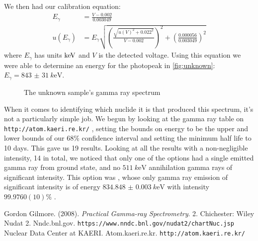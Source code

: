 \documentclass[11pt]{article}
\numberwithin{equation}{section}
\numberwithin{figure}{section}
\numberwithin{table}{section}
\begin{document}
    \par We then had our calibration equation:
    \begin{align*}
        E_{\gamma}&=\frac{V-0.002}{0.003049}\\
        u(E_{\gamma})&=E_{\gamma}\sqrt{\left(\frac{\sqrt{u(V)^2+0.022^2}}{V-0.002}\right)^2 + \left(\frac{0.000056}{0.003049}\right)^2}
    \end{align*}
    where $E_\gamma$ has units $\si[]{k\electronvolt}$ and $V$ is the detected voltage. Using this equation we were able to determine an energy for the photopeak in \autoref{fig:unknown}: $E_\gamma=\SI{843(31)}{k\electronvolt}$.

    \begin{figure}
        \caption{The unknown sample's gamma ray spectrum}
        \label{fig:unknown}
    \end{figure}

    \par When it comes to identifying which nuclide it is that produced this spectrum, it's not a particularly simple job. We begun by looking at the gamma ray table on \texttt{http://atom.kaeri.re.kr/} \cite{kaeri}, setting the bounds on energy to be the upper and lower bounds of our $68\%$ confidence interval and setting the minimum half life to 10 days. This gave us 19 results. Looking at all the results with a non-negligible intensity, 14 in total, we noticed that only one of the options had a single emitted gamma ray from ground state, and no $\SI{511}{k\electronvolt}$ annihilation gamma rays of significant intensity. This option was , whose only gamma ray emission of significant intensity is  of energy $\SI{834.848(3)}{k\electronvolt}$ with intensity $99.9760(10)\%$ \cite{nudat}. 


    \newpage
    \begin{thebibliography}{9}
        Gordon Gilmore. (2008). \textit{Practical Gamma-ray Spectrometry}. 2. Chichester: Wiley
        Nudat 2. Nndc.bnl.gov. \texttt{https://www.nndc.bnl.gov/nudat2/chartNuc.jsp}
        Nuclear Data Center at KAERI. Atom.kaeri.re.kr. \texttt{http://atom.kaeri.re.kr/}
    \end{thebibliography}
    
\end{document}
